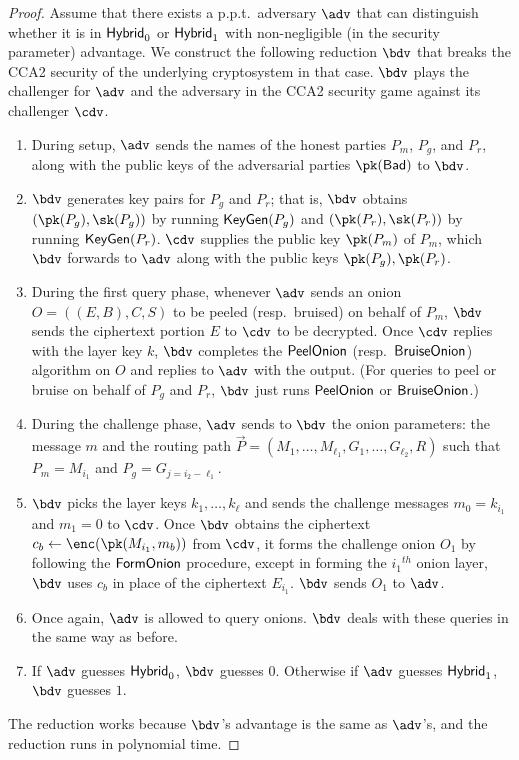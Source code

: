 \documentclass[runningheads,a4paper]{llncs}
\begin{document}
\begin{proof}
Assume that there exists a p.p.t.~adversary $\adv$ that can distinguish whether it is in $\mathsf{Hybrid}_{0}$ or $\mathsf{Hybrid}_{1}$ with non-negligible (in the security parameter)  advantage. 
We construct the following reduction $\bdv$ that breaks the CCA2 security of the underlying cryptosystem in that case. $\bdv$ plays the challenger for $\adv$ and the adversary in the CCA2 security game against its challenger $\cdv$.

\begin{enumerate}
\item During setup, $\adv$ sends the names of the honest parties $P_m$, $P_g$, and $P_r$, along with the public keys of the adversarial parties $\pk(\Bad)$ to $\bdv$. 

\item $\bdv$ generates key pairs for $P_g$ and $P_r$;
that is, $\bdv$ obtains $(\pk(P_g), \sk(P_g))$ by running $\mathsf{KeyGen}(P_g)$ and $(\pk(P_r), \sk(P_r))$ by running $\mathsf{KeyGen}(P_r)$. 
$\cdv$ supplies the public key $\pk(P_m)$ of $P_m$, which $\bdv$ forwards to $\adv$ along with the public keys $\pk(P_g), \pk(P_r)$. 

\item During the first query phase, whenever $\adv$ sends an onion $O=((E, B), C, S)$ to be peeled (resp.~bruised) on behalf of $P_m$, $\bdv$ sends the ciphertext portion $E$ to $\cdv$ to be decrypted. Once $\cdv$ replies with the layer key $k$, $\bdv$ completes the $\mathsf{PeelOnion}$ (resp.~$\mathsf{BruiseOnion}$) algorithm on $O$ and replies to $\adv$ with the output. (For queries to peel or bruise on behalf of $P_g$ and $P_r$, $\bdv$ just runs $\mathsf{PeelOnion}$ or $\mathsf{BruiseOnion}$.)  

\item During the challenge phase, $\adv$ sends to $\bdv$ the onion parameters: the message $m$ and the routing path $\vec{P} = (M_1, \dots, M_{\ell_1}, G_1, \dots, G_{\ell_2}, R)$ such that $P_m = M_{i_1}$ and $P_g = G_{j=i_2-\ell_1}$. 

\item $\bdv$ picks the layer keys $k_1, \dots, k_\ell$ and sends the challenge messages $m_0 = k_{i_1}$ and $m_1 = 0$ to $\cdv$. Once $\bdv$ obtains the ciphertext $c_b \gets \enc(\pk(M_{i_1}, m_b))$ from $\cdv$, it forms the challenge onion $O_1$ by following the $\mathsf{FormOnion}$ procedure, except in forming the ${i_1}^\mathit{th}$ onion layer, $\bdv$ uses $c_b$ in place of the ciphertext $E_{i_1}$. $\bdv$ sends $O_1$ to $\adv$. 

\item Once again, $\adv$ is allowed to query onions. $\bdv$ deals with these queries in the same way as before. 

\item If $\adv$ guesses $\mathsf{Hybrid}_{0}$, $\bdv$ guesses $0$. Otherwise if $\adv$ guesses $\mathsf{Hybrid}_{1}$, $\bdv$ guesses $1$. 
\end{enumerate}
The reduction works because $\bdv$'s advantage is the same as $\adv$'s, and the reduction runs in polynomial time. 
\end{proof} 
\end{document}
